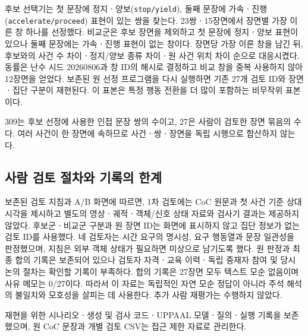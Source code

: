 \begin{revision}
후보 선택기는 첫 문장에 정지ㆍ양보(\texttt{stop/yield}), 둘째 문장에 가속ㆍ진행(\texttt{accelerate/proceed}) 표현이 있는 쌍을 찾는다. 23쌍ㆍ15장면에서 장면별 가장 이른 창 하나를 선정했다. 비교군은 후보 장면을 제외하고 첫 문장에 정지ㆍ양보 표현이 있으나 둘째 문장에는 가속ㆍ진행 표현이 없는 창이다. 장면당 가장 이른 창을 남긴 뒤, 후보와의 사건 수 차이ㆍ정지/양보 종류 차이ㆍ원 사건 위치 차이 순으로 대응시켰다. 동률은 난수 시드 20260806과 창 ID의 해시로 결정하고 비교 창을 중복 사용하지 않아 12장면을 얻었다. 보존된 원 선정 프로그램을 다시 실행하면 기존 27개 검토 ID와 장면ㆍ집단 구분이 재현된다. 이 표본은 특정 행동 전환을 더 많이 포함하는 비무작위 표본이다.

309는 후보 선정에 사용한 인접 문장 쌍의 수이고, 27은 사람이 검토한 장면 묶음의 수다. 여러 사건이 한 장면에 속하므로 사건ㆍ쌍ㆍ장면을 독립 시행으로 합산하지 않는다.

\subsection{사람 검토 절차와 기록의 한계}
\label{sec:review-protocol}
보존된 검토 지침과 A/B 화면에 따르면, 1차 검토에는 CoC 원문과 첫 사건 기준 상대 시각을 제시하고 별도의 영상ㆍ궤적ㆍ객체/신호 상태 자료와 검사기 결과는 제공하지 않았다. 후보군ㆍ비교군 구분과 원 장면 ID는 화면에 표시하지 않고 집단 정보가 없는 검토 ID를 사용했다. 네 검토자는 시간 요구의 명시성, 요구 행동열과 문장 일관성을 판정했으며, 지침은 외부 객체 상태가 필요하면 미상으로 남기도록 했다. 원 판정과 최종 합의 기록은 보존되어 있으나 검토자 자격ㆍ교육 이력ㆍ독립 중재자 참여 및 당시 논의 절차는 확인할 기록이 부족하다. 합의 기록은 27장면 모두 텍스트 모순 없음이며 사유 메모는 0/27이다. 따라서 이 자료는 독립적인 자연 모순 정답이 아니라 주석 해석의 불일치와 모호성을 살피는 데 사용한다. 추가 사람 재평가는 수행하지 않았다.

재현을 위한 시나리오ㆍ생성 및 검사 코드ㆍUPPAAL 모델ㆍ질의ㆍ실행 기록을 보존했으며, 원 CoC 문장과 개별 검토 CSV는 접근 제한 자료로 관리한다.
\end{revision}
